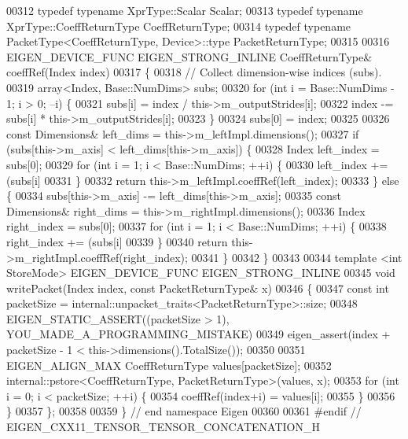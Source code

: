 \begin{DoxyCode}
00312   \textcolor{keyword}{typedef} \textcolor{keyword}{typename} XprType::Scalar Scalar;
00313   \textcolor{keyword}{typedef} \textcolor{keyword}{typename} XprType::CoeffReturnType CoeffReturnType;
00314   \textcolor{keyword}{typedef} \textcolor{keyword}{typename} PacketType<CoeffReturnType, Device>::type PacketReturnType;
00315 
00316   EIGEN\_DEVICE\_FUNC EIGEN\_STRONG\_INLINE CoeffReturnType& coeffRef(Index index)
00317   \{
00318     \textcolor{comment}{// Collect dimension-wise indices (subs).}
00319     array<Index, Base::NumDims> subs;
00320     \textcolor{keywordflow}{for} (\textcolor{keywordtype}{int} i = Base::NumDims - 1; i > 0; --i) \{
00321       subs[i] = index / this->m\_outputStrides[i];
00322       index -= subs[i] * this->m\_outputStrides[i];
00323     \}
00324     subs[0] = index;
00325 
00326     \textcolor{keyword}{const} Dimensions& left\_dims = this->m\_leftImpl.dimensions();
00327     \textcolor{keywordflow}{if} (subs[this->m\_axis] < left\_dims[this->m\_axis]) \{
00328       Index left\_index = subs[0];
00329       \textcolor{keywordflow}{for} (\textcolor{keywordtype}{int} i = 1; i < Base::NumDims; ++i) \{
00330         left\_index += (subs[i] %
00331       \}
00332       \textcolor{keywordflow}{return} this->m\_leftImpl.coeffRef(left\_index);
00333     \} \textcolor{keywordflow}{else} \{
00334       subs[this->m\_axis] -= left\_dims[this->m\_axis];
00335       \textcolor{keyword}{const} Dimensions& right\_dims = this->m\_rightImpl.dimensions();
00336       Index right\_index = subs[0];
00337       \textcolor{keywordflow}{for} (\textcolor{keywordtype}{int} i = 1; i < Base::NumDims; ++i) \{
00338         right\_index += (subs[i] %
00339       \}
00340       \textcolor{keywordflow}{return} this->m\_rightImpl.coeffRef(right\_index);
00341     \}
00342   \}
00343 
00344   \textcolor{keyword}{template} <\textcolor{keywordtype}{int} StoreMode> EIGEN\_DEVICE\_FUNC EIGEN\_STRONG\_INLINE
00345   \textcolor{keywordtype}{void} writePacket(Index index, \textcolor{keyword}{const} PacketReturnType& x)
00346   \{
00347     \textcolor{keyword}{const} \textcolor{keywordtype}{int} packetSize = internal::unpacket\_traits<PacketReturnType>::size;
00348     EIGEN\_STATIC\_ASSERT((packetSize > 1), YOU\_MADE\_A\_PROGRAMMING\_MISTAKE)
00349     eigen\_assert(index + packetSize - 1 < this->dimensions().TotalSize());
00350 
00351     EIGEN\_ALIGN\_MAX CoeffReturnType values[packetSize];
00352     internal::pstore<CoeffReturnType, PacketReturnType>(values, x);
00353     \textcolor{keywordflow}{for} (\textcolor{keywordtype}{int} i = 0; i < packetSize; ++i) \{
00354       coeffRef(index+i) = values[i];
00355     \}
00356   \}
00357 \};
00358 
00359 \} \textcolor{comment}{// end namespace Eigen}
00360 
00361 \textcolor{preprocessor}{#endif // EIGEN\_CXX11\_TENSOR\_TENSOR\_CONCATENATION\_H}
\end{DoxyCode}
